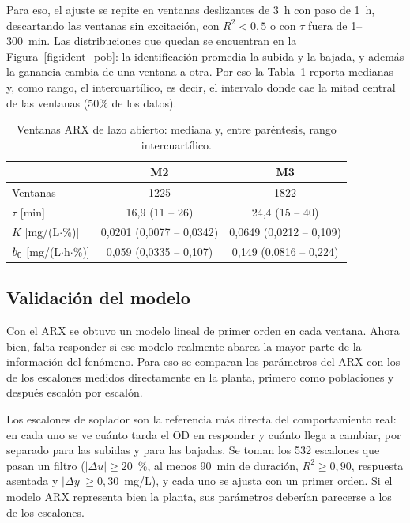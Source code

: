Para eso, el ajuste se repite en ventanas deslizantes de 3~h con paso de 1~h,
descartando las ventanas sin excitación, con $R^2 < 0{,}5$ o con $\tau$ fuera
de 1--300~min. Las distribuciones que quedan se encuentran en la Figura~\ref{fig:ident_pob}: la identificación promedia la subida y la bajada,
y además la ganancia cambia de una ventana a otra. Por eso la
Tabla~\ref{tab:ident_arx} reporta medianas y, como rango, el intercuartílico, es
decir, el intervalo donde cae la mitad central de las ventanas (50\% de los datos).

\begin{table}[!htbp]
\centering
\caption{Ventanas ARX de lazo abierto: mediana y, entre paréntesis, rango
intercuartílico.}
\label{tab:ident_arx}
\footnotesize
\begin{tabular}{lcc}
\toprule
 & \textbf{M2} & \textbf{M3} \\
\midrule
Ventanas & 1225 & 1822 \\
$\tau$ [min] & 16,9 (11 -- 26) & 24,4 (15 -- 40) \\
$K$ [mg/(L$\cdot$\%)] & 0,0201 (0,0077 -- 0,0342) & 0,0649 (0,0212 -- 0,109) \\
$b_{0}$ [mg/(L$\cdot$h$\cdot$\%)] & 0,059 (0,0335 -- 0,107) & 0,149 (0,0816 -- 0,224) \\
\bottomrule
\end{tabular}
\end{table}

\subsection{Validación del modelo}
\label{sec:ident_validacion}

Con el ARX se obtuvo un modelo lineal de primer orden en cada ventana. Ahora
bien, falta responder si ese modelo realmente abarca la mayor parte de la
información del fenómeno. Para eso se comparan los parámetros del ARX con los
de los escalones medidos directamente en la planta, primero como poblaciones y
después escalón por escalón.

Los escalones de soplador son la referencia más directa del comportamiento real: en cada uno se
ve cuánto tarda el OD en responder y cuánto llega a cambiar, por separado para
las subidas y para las bajadas. Se toman los 532 escalones que pasan un filtro
($|\Delta u| \geq 20$~\%, al menos 90~min de duración,
$R^2 \geq 0{,}90$, respuesta asentada y $|\Delta y| \geq 0{,}30$~mg/L), y cada
uno se ajusta con un primer orden. Si el modelo ARX representa bien la planta, sus
parámetros deberían parecerse a los de los escalones.

